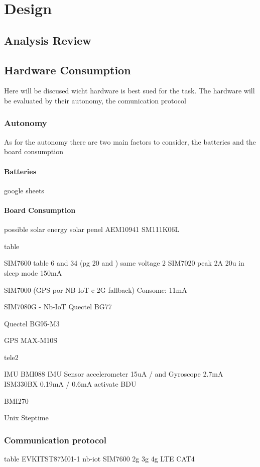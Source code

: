 
\chapter{Design}
\section{Analysis Review}



\section{Hardware Consumption}
Here will be discused wicht hardware is best sued for the task. The hardware will be evaluated by their
autonomy, the comunication protocol
\subsection{Autonomy}
As for the autonomy there are two main factors to consider, the batteries and the board consumption
\subsubsection{Batteries}
google sheets
\subsubsection{Board Consumption}

possible solar energy
solar penel
AEM10941
SM111K06L

table

SIM7600 
table 6 and 34 (pg 20 and ) same voltage
2
SIM7020
peak 2A 20u in sleep mode 150mA

SIM7000 (GPS por NB-IoT e 2G fallback)
Consome: 11mA

SIM7080G - Nb-IoT
Quectel BG77

Quectel BG95-M3

 
GPS
MAX-M10S

tele2

IMU
BMI088 IMU Sensor
accelerometer 15uA  / and Gyroscope 2.7mA
ISM330BX
0.19mA / 0.6mA
activate BDU

BMI270


Unix Steptime

\subsection{Communication protocol}

table
EVKITST87M01-1 nb-iot
SIM7600 2g 3g 4g LTE CAT4


